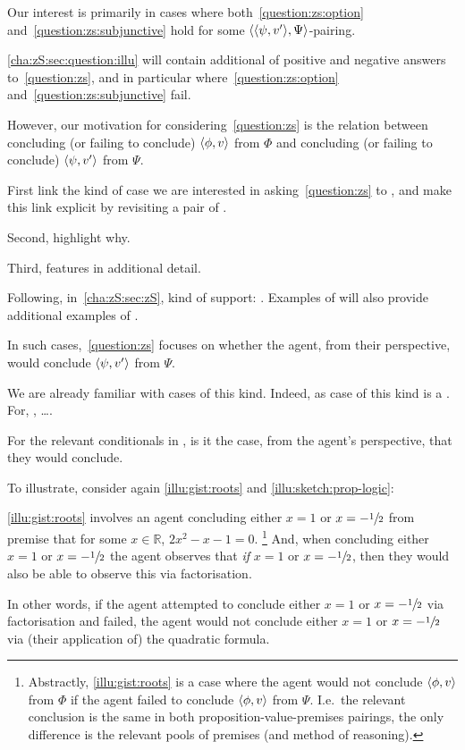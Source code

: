\begin{note}
  Our interest is primarily in cases where both~\ref{question:zs:option} and~\ref{question:zs:subjunctive} hold for some \(\langle \langle \psi, v' \rangle, \Psi \rangle\)-pairing.

  \autoref{cha:zS:sec:question:illu} will contain additional  of positive and negative answers to~\autoref{question:zs}, and in particular  where~\ref{question:zs:option} and~\ref{question:zs:subjunctive} fail.

  However, our motivation for considering~\autoref{question:zs} is the relation between concluding (or failing to conclude)  \(\langle \phi, v \rangle\) from \(\Phi\) and concluding (or failing to conclude) \(\langle \psi, v' \rangle\) from \(\Psi\).

  First link the kind of case we are interested in asking~\autoref{question:zs} to , and make this link explicit by revisiting a pair of .

  Second, highlight why.

  Third, features in additional detail.

  Following, in~\autoref{cha:zS:sec:zS}, kind of support: \zS{}.
  Examples of \zS{} will also provide additional examples of .
\end{note}

\begin{note}
  {
    \color{red}
    In such cases,~\autoref{question:zs} focuses on whether the agent, from their perspective, would conclude \(\langle \psi, v' \rangle\) from \(\Psi\).

    We are already familiar with cases of this kind.
    Indeed, as case of this kind is a .
    For, , \dots.

    For the relevant conditionals in , is it the case, from the agent's perspective, that they would conclude.
  }

  To illustrate, consider again \autoref{illu:gist:roots} and \autoref{illu:sketch:prop-logic}:
\end{note}

\begin{note}
  \autoref{illu:gist:roots} involves an agent concluding either \(x = 1\) or \(x = -\sfrac{1}{2}\) from premise that for some \(x \in \mathbb{R}\), \(2x^{2} - x - 1 = 0\).%
  \footnote{
    Abstractly, \autoref{illu:gist:roots} is a case where the agent would not conclude \(\langle \phi, v \rangle\) from \(\Phi\) if the agent failed to conclude \(\langle \phi, v \rangle\) from \(\Psi\).
    I.e.\ the relevant conclusion is the same in both proposition-value-premises pairings, the only difference is the relevant pools of premises (and method of reasoning).
  }
  And, when concluding either \(x = 1\) or \(x = -\sfrac{1}{2}\) the agent observes that \emph{if} \(x = 1\) or \(x = -\sfrac{1}{2}\), then they would also be able to observe this via factorisation.

  In other words, if the agent attempted to conclude either \(x = 1\) or \(x = -\sfrac{1}{2}\) via factorisation and failed, the agent would not conclude either \(x = 1\) or \(x = -\sfrac{1}{2}\) via (their application of) the quadratic formula.
\end{note}

